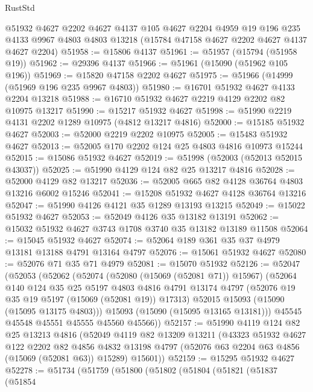 \begin{lexlean}{RustStd}
\begin{coremodule}
    @51932
    @4627
    @2202
    @4627
    @4137
    @105
    @4627
    @2204
    @4959
    @19
    @196
    @235
    @4133
    @9967
    @4803
    @4803
    @13218
    (@15784 @47158 @4627 @2202 @4627 @4137 @4627 @2204)
@51958 := @15806 @4137
@51961 := @51957 (@15794 (@51958 @19))
@51962 := @29396 @4137
@51966 := @51961 (@15090 (@51962 @105 @196))
@51969 := @15820 @47158 @2202 @4627
@51975 := @51966 (@14999 (@51969 @196 @235 @9967 @4803))
@51980 := @16701 @51932 @4627 @4133 @2204 @13218
@51988 := @16710 @51932 @4627 @2219 @4129 @2202 @82 @10975 @13217
@51990 := @15217 @51932 @4627
@51998 := @51990 @2219 @4131 @2202 @1289 @10975 (@4812 @13217 @4816)
@52000 := @15185 @51932 @4627
@52003 := @52000 @2219 @2202 @10975
@52005 := @15483 @51932 @4627
@52013 := @52005 @170 @2202 @124 @25 @4803 @4816 @10973 @15244
@52015 := @15086 @51932 @4627
@52019 := @51998 (@52003 (@52013 @52015 @43037))
@52025 := @51990 @4129 @124 @82 @25 @13217 @4816
@52028 := @52000 @4129 @82 @13217
@52036 := @52005 @665 @82 @4128 @36764 @4803 @13216 @6002 @15246
@52041 := @15208 @51932 @4627 @4128 @36764 @13216
@52047 := @51990 @4126 @4121 @35 @1289 @13193 @13215
@52049 := @15022 @51932 @4627
@52053 := @52049 @4126 @35 @13182 @13191
@52062 := @15032 @51932 @4627 @3743 @1708 @3740 @35 @13182 @13189 @11508
@52064 := @15045 @51932 @4627
@52074 := @52064 @189 @361 @35 @37 @4979 @13181 @13188 @4791 @13164 @4797
@52076 := @15061 @51932 @4627
@52080 := @52076 @71 @35 @71 @4979
@52081 := @15070 @51932
@52126 := @52047
    (@52053
      (@52062
        (@52074
          (@52080 (@15069 (@52081 @71)) @15967)
          (@52064
            @140
            @124
            @35
            @25
            @5197
            @4803
            @4816
            @4791
            @13174
            @4797
            (@52076 @19 @35 @19 @5197 (@15069 (@52081 @19)) @17313)
            @52015
            @15093
            (@15090 (@15095 @13175 @4803)))
          @15093
          (@15090 (@15095 @13165 @13181)))
        @45545
        @45548
        @45551
        @45555
        @45560
        @45566))
@52157 := @51990
    @4119
    @124
    @82
    @25
    @13213
    @4816
    (@52049
      @4119
      @82
      @13209
      @13211
      (@43323
        @51932
        @4627
        @122
        @2202
        @82
        @4856
        @4832
        @13198
        @4797
        (@52076 @63 @2204 @63 @4856 (@15069 (@52081 @63)) @15289)
        @15601))
@52159 := @15295 @51932 @4627
@52278 := @51734
    (@51759
      (@51800
        (@51802
          (@51804
            (@51821
              (@51837
                (@51854

\end{coremodule}
\end{lexlean}
